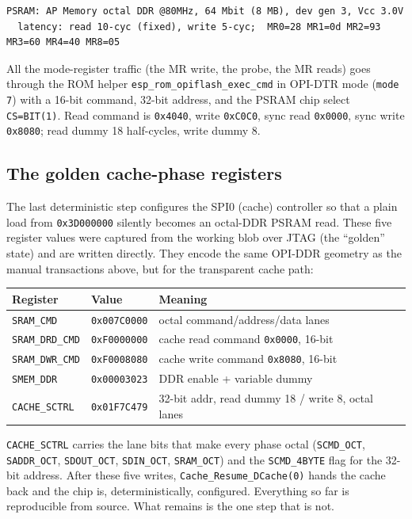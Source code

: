 \begin{lstlisting}[style=sh]
PSRAM: AP Memory octal DDR @80MHz, 64 Mbit (8 MB), dev gen 3, Vcc 3.0V
  latency: read 10-cyc (fixed), write 5-cyc;  MR0=28 MR1=0d MR2=93 MR3=60 MR4=40 MR8=05
\end{lstlisting}

All the mode-register traffic (the MR write, the probe, the MR reads) goes
through the ROM helper \texttt{esp\_rom\_opiflash\_exec\_cmd} in OPI-DTR mode
(\texttt{mode 7}) with a 16-bit command, 32-bit address, and the PSRAM chip select
\texttt{CS=BIT(1)}. Read command is \texttt{0x4040}, write \texttt{0xC0C0}, sync read
\texttt{0x0000}, sync write \texttt{0x8080}; read dummy 18 half-cycles, write dummy 8.

\subsection{The golden cache-phase registers}

The last deterministic step configures the SPI0 (cache) controller so that a plain
load from \texttt{0x3D000000} silently becomes an octal-DDR PSRAM read. These five
register values were captured from the working blob over JTAG (the ``golden''
state) and are written directly. They encode the same OPI-DDR geometry as the
manual transactions above, but for the transparent cache path:

\begin{longtable}{p{2.6cm} p{2.4cm} p{6.8cm}}
\toprule
\textbf{Register} & \textbf{Value} & \textbf{Meaning} \\ \midrule
\endhead
\texttt{SRAM\_CMD}  & \texttt{0x007C0000} & octal command/address/data lanes \\
\texttt{SRAM\_DRD\_CMD} & \texttt{0xF0000000} & cache read command \texttt{0x0000}, 16-bit \\
\texttt{SRAM\_DWR\_CMD} & \texttt{0xF0008080} & cache write command \texttt{0x8080}, 16-bit \\
\texttt{SMEM\_DDR}  & \texttt{0x00003023} & DDR enable + variable dummy \\
\texttt{CACHE\_SCTRL} & \texttt{0x01F7C479} & 32-bit addr, read dummy 18 / write 8, octal lanes \\
\bottomrule
\end{longtable}

\texttt{CACHE\_SCTRL} carries the lane bits that make every phase octal
(\texttt{SCMD\_OCT}, \texttt{SADDR\_OCT}, \texttt{SDOUT\_OCT}, \texttt{SDIN\_OCT},
\texttt{SRAM\_OCT}) and the \texttt{SCMD\_4BYTE} flag for the 32-bit address. After
these five writes, \texttt{Cache\_Resume\_DCache(0)} hands the cache back and the
chip is, deterministically, configured. Everything so far is reproducible from
source. What remains is the one step that is not.

